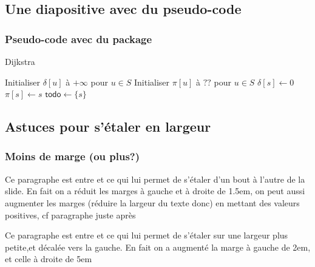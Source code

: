 \subsection{Une diapositive avec du pseudo-code}
\begin{frame}
	\small
	\frametitle{Pseudo-code avec  du package }
	\begin{algorithm}[H]
		\caption{\textsf{Dijkstra}}
		\BlankLine
		Initialiser $\delta[u]$ à $+\infty$ pour $u \in S$\;
 		Initialiser $\pi[u]$ à $\textsf{??}$ pour $u \in S$\;
  		$\delta[s] \gets 0$\;
 		$\pi[s] \gets s$\;
  		$\textsf{todo} \gets \{s\}$\;
 	\Return{$\delta$}
\end{algorithm}
\end{frame}

\subsection{Astuces pour s'étaler en largeur}
\begin{frame}
  \frametitle{Moins de marge (ou plus?)}

  \begin{adjustwidth}{-1.5 em}{-1.5em}
    Ce paragraphe est entre 
    \lin{\begin{adjustwidth}{-1.5 em}{-1.5em}} et \lin{\end{adjustwidth}}
    ce qui lui permet de s'étaler  d'un bout à l'autre de la slide.
    En fait on a réduit les marges à gauche et à droite de 1.5em,
    on peut aussi augmenter les marges (réduire la largeur du texte donc) en mettant des valeurs positives, cf paragraphe juste après
  \end{adjustwidth}
  
  \bigskip
  
  \begin{adjustwidth}{2 em}{5em}
    Ce paragraphe est entre 
    \lin{\begin{adjustwidth}{2 em}{5em}} et \lin{\end{adjustwidth}}
    ce qui lui permet de s'étaler sur une largeur plus petite,et décalée vers la gauche.
    En fait on a augmenté la marge à gauche de 2em, et celle à droite de 5em
  \end{adjustwidth}
\end{frame}




